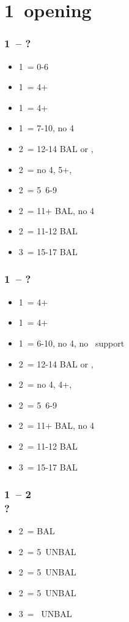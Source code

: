 \section{\texorpdfstring{1\mins\ opening}{1mOpening}}\label{sec:1mOpening}

\subsubsection*{1\clubs\ -- ?}
\begin{itemize}
    \item 1\diams\ = 0-6
    \item 1\hearts\ = 4+\hearts
    \item 1\spades\ = 4+\spades
    \item 1\ntx\ = 7-10, no 4\majs
    \item 2\clubs\ = 12-14 BAL or \clubs, \gf
    \item 2\diams\ = no 4\majs, 5+\diams, \gf
    \item 2\hearts\ = 5\hearts\ 6-9
    \item 2\spades\ = 11+ BAL, no 4\majs
    \item 2\ntx\ = 11-12 BAL
    \item 3\nt\ = 15-17 BAL
\end{itemize}

\subsubsection*{1\diams\ -- ?}
\begin{itemize}
    \item 1\hearts\ = 4+\hearts
    \item 1\spades\ = 4+\spades
    \item 1\ntx\ = 6-10, no 4\majs, no \diams\ support
    \item 2\clubs\ = 12-14 BAL or \clubs, \gf
    \item 2\diams\ = no 4\majs, 4+\diams, \gf
    \item 2\hearts\ = 5\hearts\ 6-9
    \item 2\spades\ = 11+ BAL, no 4\majs
    \item 2\ntx\ = 11-12 BAL
    \item 3\nt\ = 15-17 BAL
\end{itemize}

\subsubsection*{1\clubs\ -- 2\clubs \\ ?}
\begin{itemize}
    \item 2\diams\ = BAL
    \item 2\hearts\ = 5\hearts\ UNBAL
    \item 2\spades\ = 5\spades\ UNBAL
    \item 2\nt\ = 5\diams\ UNBAL
    \item 3\clubs\ = \clubs\ UNBAL
\end{itemize}

